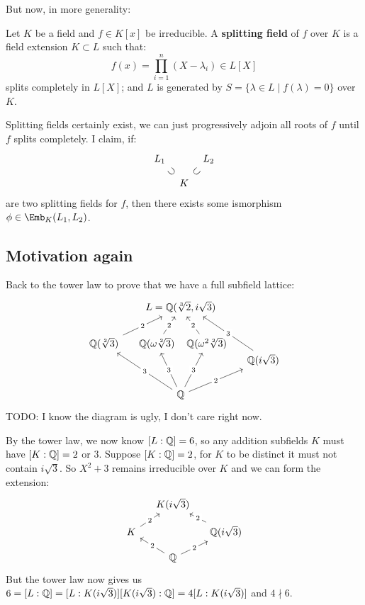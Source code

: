 \documentclass{article}
\begin{document}
But now, in more generality:

\begin{definition}
    Let $K$ be a field and $f\in K[x]$ be irreducible. A \textbf{splitting field} of $f$ over $K$ is a field extension $K\subset L$ such that: \[
        f(x) = \prod_{i=1}^n(X-\lambda_i) \in L[X]
    \] splits completely in $L[X]$; and $L$ is generated by $S=\{\lambda \in L \mid f(\lambda) = 0\}$ over $K$.
\end{definition}
Splitting fields certainly exist, we can just progressively adjoin all roots of $f$ until $f$ splits completely. I claim, if: \[
\begin{tikzcd}[row sep = small, column sep = tiny]
    L_1 \arrow[dr, phantom, sloped, "\supset"] & & L_2 \arrow[dl, phantom, sloped, "\subset"]\\
    & K
\end{tikzcd}
\] are two splitting fields for $f$, then there exists some ismorphism $\phi\in\Emb_K(L_1,L_2)$.

\subsection{Motivation again}

Back to the tower law to prove that we have a full subfield lattice:\[
\begin{tikzcd}[column sep=small]
& &[-50pt] L = \bQ(\sqrt[3]{2},i\sqrt{3})\\
\bQ(\sqrt[2]{3}) \arrow[urr, "2" description] 
& \bQ(\omega\sqrt[2]{3}) \arrow[ur, "2" description] 
& &[-50pt] \bQ(\omega^2\sqrt[2]{3}) \arrow[ul, "2" description]\\[-20pt]
& & & & \bQ(i\sqrt{3})\arrow[uull, end anchor={[xshift=-4ex]south east}, "3" description]\\
& & \bQ \arrow[uull, "3" description] \arrow[uul, "3" description] \arrow[uur, "3" description] \arrow[urr, "2" description]
\end{tikzcd}
\]
TODO: I know the diagram is ugly, I don't care right now.

By the tower law, we now know $[L:\mathbb{Q}]=6$, so any addition subfields $K$ must have $[K:\mathbb{Q}]=2$ or $3$. Suppose $[K:\mathbb{Q}]=2$, for $K$ to be distinct it must not contain $i\sqrt{3}$. So $X^2+3$ remains irreducible over $K$ and we can form the extension:\[
\begin{tikzcd}[column sep=small, row sep = small]
    & K(i\sqrt{3})\\
    K \arrow[ur, "2" description]& & \bQ(i\sqrt{3}) \arrow[ul, "2" description]\\
    & \bQ \arrow[ul, "2" description] \arrow[ur, "2" description]
\end{tikzcd}
\]
But the tower law now gives us $6 = [L:\mathbb{Q}] = [L:K(i\sqrt{3})][K(i\sqrt{3}):\mathbb{Q}] = 4[L:K(i\sqrt{3})]$ and $4\nmid 6$.
\end{document}
